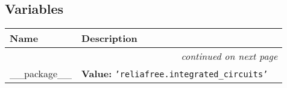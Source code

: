 
  \subsection{Variables}

    \vspace{-1cm}
\hspace{\varindent}\begin{longtable}{|p{\varnamewidth}|p{\vardescrwidth}|l}
\cline{1-2}
\cline{1-2} \centering \textbf{Name} & \centering \textbf{Description}& \\
\cline{1-2}
\endhead\cline{1-2}\multicolumn{3}{r}{\small\textit{continued on next page}}\\\endfoot\cline{1-2}
\endlastfoot\raggedright \_\-\_\-p\-a\-c\-k\-a\-g\-e\-\_\-\_\- & \raggedright \textbf{Value:} 
{\tt \texttt{'}\texttt{reliafree.integrated\_circuits}\texttt{'}}&\\
\cline{1-2}
\end{longtable}

